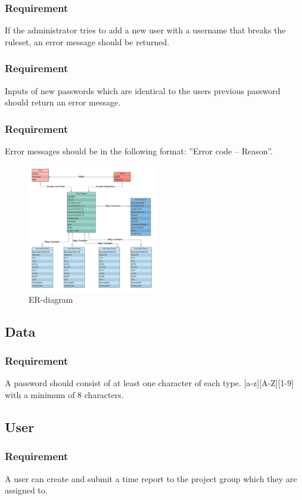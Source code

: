 \documentclass{article}
\begin{document}
\subsubsection{Requirement}
If the administrator tries to add a new user with a username that breaks the ruleset, an error message should be returned.
\subsubsection{Requirement}
Inputs of new passwords which are identical to the users previous password should return an error message. 
\subsubsection{Requirement}
Error messages should be in the following format: ”Error code – Reason”.


\begin{figure}[placement specifier]
\centering
\includegraphics[width=0.5\textwidth]{PUSPERdiagram.png}
\caption{ER-diagram}
\end{figure}





\subsection{Data}
\subsubsection{Requirement}
A password should consist of at least one character of each type. [a-z][A-Z][1-9] with a minimum of 8 characters.

\subsection{User}
\subsubsection{Requirement}
A user can create and submit a time report to the project group which they are assigned to.
\end{document}
